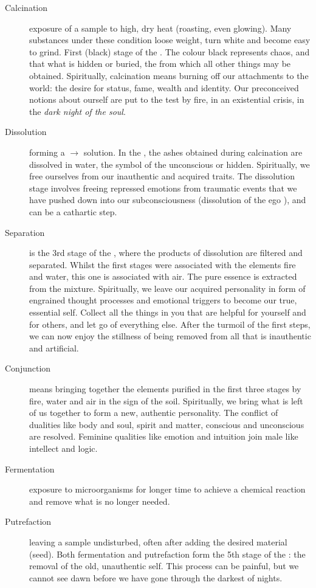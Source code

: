 \documentclass[notitlepage,british]{scrartcl}
\begin{document}
\begin{refsection}
\begin{description}
  \item[Calcination]{exposure of a sample to high, dry heat (roasting, even glowing). Many substances under these condition loose weight, turn white and become easy to grind. First (black) stage of the . The colour black represents chaos, and that what is hidden or buried, the  from which all other things may be obtained. Spiritually, calcination means burning off our attachments to the world: the desire for status, fame, wealth and identity. Our preconceived notions about ourself are put to the test by fire, in an existential crisis, in the \emph{dark night of the soul}.}
  \item[Dissolution]{forming a \(\rightarrow\) solution. In the , the ashes obtained during calcination are dissolved in water, the symbol of the unconscious or hidden. Spiritually, we free ourselves from our inauthentic and acquired traits. The dissolution stage involves freeing repressed emotions from traumatic events that we have pushed down into our subconsciousness (dissolution of the ego \parencite{Jun-44}), and can be a cathartic step.}
  \item[Separation]{is the 3rd stage of the , where the products of dissolution are filtered and separated. Whilst the first stages were associated with the elements fire and water, this one is associated with air. The pure essence is extracted from the mixture. Spiritually, we leave our acquired personality in form of engrained thought processes and emotional triggers to become our true, essential self. Collect all the things in you that are helpful for yourself and for others, and let go of everything else. After the turmoil of the first steps, we can now enjoy the stillness of being removed from all that is inauthentic and artificial. }
  \item[Conjunction]{means bringing together the elements purified in the first three stages by fire, water and air in the sign of the soil. Spiritually, we bring what is left of us together to form a new, authentic personality. The conflict of dualities like body and soul, spirit and matter, conscious and unconscious are resolved. Feminine qualities like emotion and intuition join male like intellect and logic.  }
  \item[Fermentation]{exposure to microorganisms for longer time to achieve a chemical reaction and remove what is no longer needed. }
  \item[Putrefaction]{leaving a sample undisturbed, often after adding the desired material (seed). Both fermentation and putrefaction form the 5th stage of the : the removal of the old, unauthentic self. This process can be painful, but we cannot see dawn before we have gone through the darkest of nights. }

\end{description}
\end{refsection}
\end{document}
